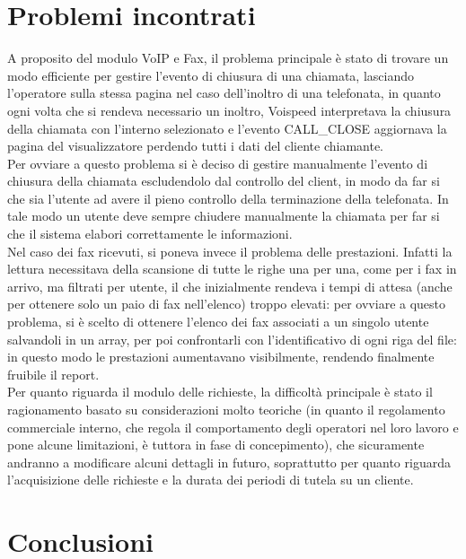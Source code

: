 \chapter{Problemi incontrati}
A proposito del modulo VoIP e Fax, il problema principale \`e stato di trovare un modo efficiente per gestire l'evento di chiusura di una chiamata, lasciando l'operatore sulla stessa pagina nel caso dell'inoltro di una telefonata, in quanto ogni volta che si rendeva necessario un inoltro, Voispeed interpretava la chiusura della chiamata con l'interno selezionato e  l'evento CALL\_CLOSE aggiornava la pagina del visualizzatore perdendo tutti i dati del cliente chiamante. \\
Per ovviare a questo problema si \`e deciso di gestire manualmente l'evento di chiusura della chiamata escludendolo dal controllo del client, in modo da far si che sia l'utente ad avere il pieno controllo della terminazione della telefonata. In tale modo un utente deve sempre chiudere manualmente la chiamata per far si che il sistema elabori correttamente le informazioni.\\
Nel caso dei fax ricevuti, si poneva invece il problema delle prestazioni. Infatti la lettura necessitava della scansione di tutte le righe una per una, come per i fax in arrivo, ma filtrati per utente, il che inizialmente rendeva i tempi di attesa (anche per ottenere solo un paio di fax nell'elenco) troppo elevati: per ovviare a questo problema, si \`e scelto di ottenere l'elenco dei fax associati a un singolo utente salvandoli in un array, per poi confrontarli con l'identificativo di ogni riga del file: in questo modo le prestazioni aumentavano visibilmente, rendendo finalmente fruibile il report. \\
Per quanto riguarda il modulo delle richieste, la difficolt\`a principale \`e stato il ragionamento basato su considerazioni molto teoriche (in quanto il regolamento commerciale interno, che regola il comportamento degli operatori nel loro lavoro e pone alcune limitazioni, \`e tuttora in fase di concepimento), che sicuramente andranno a modificare alcuni dettagli in futuro, soprattutto per quanto riguarda l'acquisizione delle richieste e la durata dei periodi di tutela su un cliente.

\chapter{Conclusioni}
